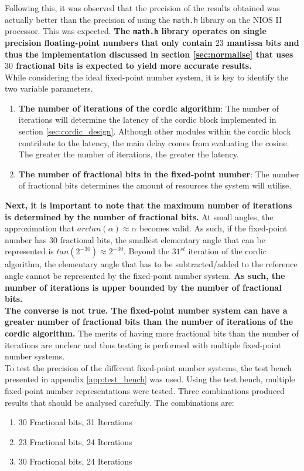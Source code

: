 \documentclass{article}
\begin{document}
Following this, it was observed that the precision of the results obtained was actually better than the precision of using the {\tt math.h} library on the NIOS II processor. This was expected. \textbf{The {\tt math.h} library operates on single precision floating-point numbers that only contain $23$ mantissa bits and thus the implementation discussed in section \ref{sec:normalise} that uses $30$ fractional bits is expected to yield more accurate results.}\\

While considering the ideal fixed-point number system, it is key to identify the two variable parameters.
\begin{enumerate}
    \item \textbf{The number of iterations of the cordic algorithm}: The number of iterations will determine the latency of the cordic block implemented in section \ref{sec:cordic_design}. Although other modules within the cordic block contribute to the latency, the main delay comes from evaluating the cosine. The greater the number of iterations, the greater the latency.
    \item \textbf{The number of fractional bits in the fixed-point number}: The number of fractional bits determines the amount of resources the system will utilise.  
\end{enumerate}

\textbf{Next, it is important to note that the maximum number of iterations is determined by the number of fractional bits.} At small angles, the approximation that $arctan(\alpha) \approx \alpha$ becomes valid. As such, if the fixed-point number has $30$ fractional bits, the smallest elementary angle that can be represented is $tan(2^{-30}) \approx 2^{-30}$. Beyond the $31^{st}$ iteration of the cordic algorithm, the elementary angle that has to be subtracted/added to the reference angle cannot be represented by the fixed-point number system. \textbf{As such, the number of iterations is upper bounded by the number of fractional bits.}\\

\textbf{The converse is not true. The fixed-point number system can have a greater number of fractional bits than the number of iterations of the cordic algorithm.} The merits of having more fractional bits than the number of iterations are unclear and thus testing is performed with multiple fixed-point number systems.\\ 

To test the precision of the different fixed-point number systems, the test bench presented in appendix \ref{app:test_bench} was used. Using the test bench, multiple fixed-point number representations were tested. Three combinations produced results that should be analysed carefully. The combinations are:
\begin{enumerate}
    \item 30 Fractional bits, 31 Iterations
    \item 23 Fractional bits, 24 Iterations
    \item 30 Fractional bits, 24 Iterations
\end{enumerate}
\end{document}
